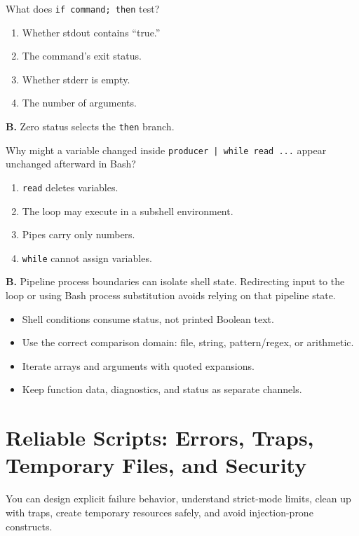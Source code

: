 \documentclass[11pt,oneside,openany]{book}
\newcommand{\fourchoices}[4]{%
  \begin{enumerate}[label=\Alph*),leftmargin=2em,itemsep=0.25em]
    \item #1
    \item #2
    \item #3
    \item #4
  \end{enumerate}}
\newcommand{\chaptergoals}[1]{%
  \begin{tcolorbox}[colback=Paper,colframe=Blue,title={Learning outcomes},fonttitle=\bfseries]
  #1
  \end{tcolorbox}}
\begin{document}
\begin{questionbox}[title={Medium 18.1 -- Shell condition}]
What does \texttt{if command; then} test?
\fourchoices{Whether stdout contains “true.”}{The command's exit status.}{Whether stderr is empty.}{The number of arguments.}
\end{questionbox}
\begin{answerbox}
\textbf{B.} Zero status selects the \texttt{then} branch.
\end{answerbox}

\begin{questionbox}[title={Hard 18.2 -- Pipeline loop}]
Why might a variable changed inside \texttt{producer | while read ...} appear unchanged afterward in Bash?
\fourchoices{\texttt{read} deletes variables.}{The loop may execute in a subshell environment.}{Pipes carry only numbers.}{\texttt{while} cannot assign variables.}
\end{questionbox}
\begin{answerbox}
\textbf{B.} Pipeline process boundaries can isolate shell state. Redirecting input to the loop or using Bash process substitution avoids relying on that pipeline state.
\end{answerbox}

\begin{recapbox}
\begin{itemize}
  \item Shell conditions consume status, not printed Boolean text.
  \item Use the correct comparison domain: file, string, pattern/regex, or arithmetic.
  \item Iterate arrays and arguments with quoted expansions.
  \item Keep function data, diagnostics, and status as separate channels.
\end{itemize}
\end{recapbox}

\chapter{Reliable Scripts: Errors, Traps, Temporary Files, and Security}
\chaptergoals{You can design explicit failure behavior, understand strict-mode limits, clean up with traps, create temporary resources safely, and avoid injection-prone constructs.}
\end{document}
